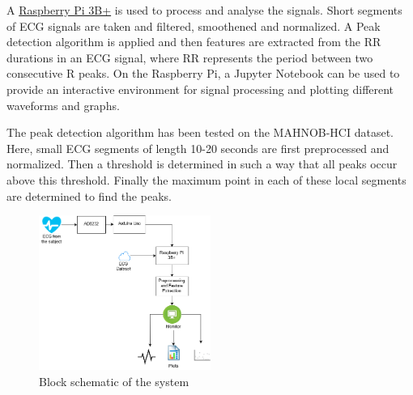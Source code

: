 \documentclass[11pt]{article}
\theoremstyle{definition}
\begin{document}
  A \underline{Raspberry Pi 3B+} is used to process and analyse the signals.
  Short segments of ECG signals are taken and filtered, smoothened and normalized.
  A Peak detection algorithm is applied and then features are extracted from the RR durations in an ECG signal, where RR represents the period between two consecutive R peaks.
  On the Raspberry Pi, a Jupyter Notebook can be used to provide an interactive environment for signal processing and plotting different waveforms and graphs.

  The peak detection algorithm has been tested on the MAHNOB-HCI\cite{lichtenauer2011mahnob} dataset. Here, small ECG segments of length 10-20 seconds are first preprocessed and normalized. Then a threshold is determined in such a way that all peaks occur above this threshold. Finally the maximum point in each of these local segments are determined to find the peaks.

  \begin{figure}
    \centering
    \includegraphics[width=0.5\textwidth]{images/block_diagram}
    \caption{Block schematic of the system}
  \end{figure}
\end{document}
